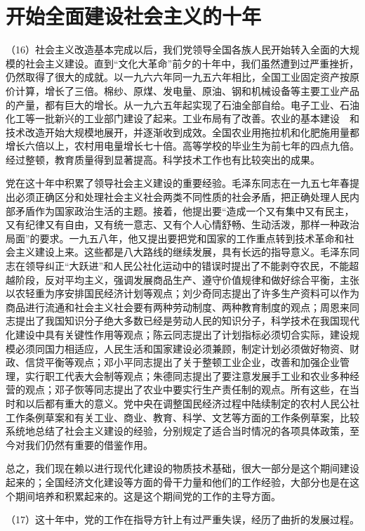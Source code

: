 \section{开始全面建设社会主义的十年}

（16）社会主义改造基本完成以后，我们党领导全国各族人民开始转入全面的大规模的社会主义建设。直到“文化大革命”前夕的十年中，我们虽然遭到过严重挫折，仍然取得了很大的成就。以一九六六年同一九五六年相比，全国工业固定资产按原价计算，增长了三倍。棉纱、原煤、发电量、原油、钢和机械设备等主要工业产品的产量，都有巨大的增长。从一九六五年起实现了石油全部自给。电子工业、石油化工等一批新兴的工业部门建设了起来。工业布局有了改善。农业的基本建设　和技术改造开始大规模地展开，并逐渐收到成效。全国农业用拖拉机和化肥施用量都增长六倍以上，农村用电量增长七十倍。高等学校的毕业生为前七年的四点九倍。经过整顿，教育质量得到显著提高。科学技术工作也有比较突出的成果。

党在这十年中积累了领导社会主义建设的重要经验。毛泽东同志在一九五七年春提出必须正确区分和处理社会主义社会两类不同性质的社会矛盾，把正确处理人民内部矛盾作为国家政治生活的主题。接着，他提出要“造成一个又有集中又有民主，又有纪律又有自由，又有统一意志、又有个人心情舒畅、生动活泼，那样一种政治局面”的要求。一九五八年，他又提出要把党和国家的工作重点转到技术革命和社会主义建设上来。这些都是八大路线的继续发展，具有长远的指导意义。毛泽东同志在领导纠正“大跃进”和人民公社化运动中的错误时提出了不能剥夺农民，不能超越阶段，反对平均主义，强调发展商品生产、遵守价值规律和做好综合平衡，主张以农轻重为序安排国民经济计划等观点；刘少奇同志提出了许多生产资料可以作为商品进行流通和社会主义社会要有两种劳动制度、两种教育制度的观点；周恩来同志提出了我国知识分子绝大多数已经是劳动人民的知识分子，科学技术在我国现代化建设中具有关键性作用等观点；陈云同志提出了计划指标必须切合实际，建设规模必须同国力相适应，人民生活和国家建设必须兼顾，制定计划必须做好物资、财政、信贷平衡等观点；邓小平同志提出了关于整顿工业企业，改善和加强企业管理，实行职工代表大会制等观点；朱德同志提出了要注意发展手工业和农业多种经营的观点；邓子恢等同志提出了农业中要实行生产责任制的观点。所有这些，在当时和以后都有重大的意义。党中央在调整国民经济过程中陆续制定的农村人民公社工作条例草案和有关工业、商业、教育、科学、文艺等方面的工作条例草案，比较系统地总结了社会主义建设的经验，分别规定了适合当时情况的各项具体政策，至今对我们仍然有重要的借鉴作用。

总之，我们现在赖以进行现代化建设的物质技术基础，很大一部分是这个期间建设起来的；全国经济文化建设等方面的骨干力量和他们的工作经验，大部分也是在这个期间培养和积累起来的。这是这个期间党的工作的主导方面。

（17）这十年中，党的工作在指导方针上有过严重失误，经历了曲折的发展过程。

